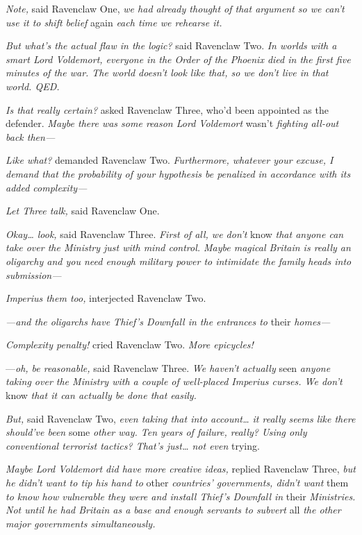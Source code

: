 \emph{Note,} said Ravenclaw One, \emph{we had already thought of that argument 
so we can't use it to shift belief} again \emph{each time we rehearse it.}

\emph{But what's the actual flaw in the logic?} said Ravenclaw Two. \emph{In 
worlds with a smart Lord Voldemort, everyone in the Order of the Phoenix died 
in the first five minutes of the war. The world doesn't look like that, so we 
don't live in that world. QED.}

\emph{Is that really certain?} asked Ravenclaw Three, who'd been appointed as 
the defender. \emph{Maybe there was some reason Lord Voldemort} wasn't 
\emph{fighting all-out back then---}

\emph{Like what?} demanded Ravenclaw Two. \emph{Furthermore, whatever your 
excuse, I demand that the probability of your hypothesis be penalized in 
accordance with its added complexity---}

\emph{Let Three talk,} said Ravenclaw One.

\emph{Okay{\ldots} look,} said Ravenclaw Three. \emph{First of all, we don't} 
know \emph{that anyone can take over the Ministry just with mind control. Maybe 
magical Britain is really an oligarchy and you need enough military power to 
intimidate the family heads into submission---}

\emph{Imperius them too,} interjected Ravenclaw Two.

\emph{---and the oligarchs have Thief's Downfall in the entrances to} 
their \emph{homes---}

\emph{Complexity penalty!} cried Ravenclaw Two. \emph{More epicycles!}

---\emph{oh, be reasonable,} said Ravenclaw Three. \emph{We haven't actually} 
seen \emph{anyone taking over the Ministry with a couple of well-placed 
Imperius curses. We don't} know \emph{that it can actually be done that easily.}

\emph{But,} said Ravenclaw Two, \emph{even taking that into account{\ldots} it 
really seems like there should've been} some \emph{other way. Ten years of 
failure, really? Using only conventional terrorist tactics? That's just{\ldots} 
not even} trying.

\emph{Maybe Lord Voldemort did have more creative ideas,} replied Ravenclaw 
Three, \emph{but he didn't want to tip his hand to} other \emph{countries' 
governments, didn't want} them \emph{to know how vulnerable they were and 
install Thief's Downfall in} their \emph{Ministries. Not until he had Britain 
as a base and enough servants to subvert} all \emph{the other major governments 
simultaneously.}

